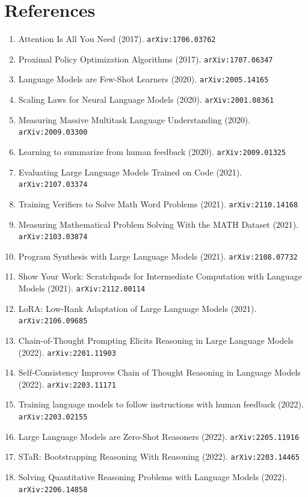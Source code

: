 \documentclass[11pt]{article}
\begin{document}
\section*{References}
\begin{enumerate}\small
  \item Attention Is All You Need (2017). \texttt{arXiv:1706.03762}
  \item Proximal Policy Optimization Algorithms (2017). \texttt{arXiv:1707.06347}
  \item Language Models are Few-Shot Learners (2020). \texttt{arXiv:2005.14165}
  \item Scaling Laws for Neural Language Models (2020). \texttt{arXiv:2001.08361}
  \item Measuring Massive Multitask Language Understanding (2020). \texttt{arXiv:2009.03300}
  \item Learning to summarize from human feedback (2020). \texttt{arXiv:2009.01325}
  \item Evaluating Large Language Models Trained on Code (2021). \texttt{arXiv:2107.03374}
  \item Training Verifiers to Solve Math Word Problems (2021). \texttt{arXiv:2110.14168}
  \item Measuring Mathematical Problem Solving With the MATH Dataset (2021). \texttt{arXiv:2103.03874}
  \item Program Synthesis with Large Language Models (2021). \texttt{arXiv:2108.07732}
  \item Show Your Work: Scratchpads for Intermediate Computation with Language
  Models (2021). \texttt{arXiv:2112.00114}
  \item LoRA: Low-Rank Adaptation of Large Language Models (2021). \texttt{arXiv:2106.09685}
  \item Chain-of-Thought Prompting Elicits Reasoning in Large Language Models (2022). \texttt{arXiv:2201.11903}
  \item Self-Consistency Improves Chain of Thought Reasoning in Language Models (2022). \texttt{arXiv:2203.11171}
  \item Training language models to follow instructions with human feedback (2022). \texttt{arXiv:2203.02155}
  \item Large Language Models are Zero-Shot Reasoners (2022). \texttt{arXiv:2205.11916}
  \item STaR: Bootstrapping Reasoning With Reasoning (2022). \texttt{arXiv:2203.14465}
  \item Solving Quantitative Reasoning Problems with Language Models (2022). \texttt{arXiv:2206.14858}

\end{enumerate}
\end{document}
